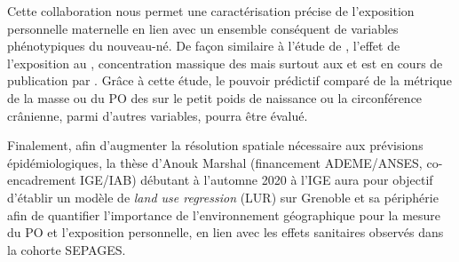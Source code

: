 Cette collaboration nous permet une caractérisation précise de
l'exposition personnelle maternelle en lien avec un ensemble conséquent de variables
phénotypiques du nouveau-né.
De façon similaire à l'étude de \cite{ouidirEstimation2015}, l'effet de l'exposition au
, concentration massique des \PMdc{} mais surtout aux \POAAv{} et \PODTTv{} est en
cours de publication par \cite{borlazaPersonalinprep.}.
Grâce à cette étude, le pouvoir prédictif comparé de la métrique de la masse ou du PO des \PMdc{}
sur le petit poids de naissance ou la circonférence crânienne, parmi d'autres variables,
pourra être évalué.

Finalement, afin d'augmenter la résolution spatiale nécessaire aux prévisions
épidémiologiques, la thèse d'Anouk Marshal (financement ADEME/ANSES, co-encadrement
IGE/IAB) débutant à l'automne 2020 à
l'IGE aura pour objectif d'établir un modèle de \textit{land use regression} (LUR) sur
Grenoble et sa périphérie afin de quantifier l'importance de l'environnement géographique
pour la mesure du PO et l'exposition personnelle, en lien avec les effets sanitaires
observés dans la cohorte SEPAGES.

%


